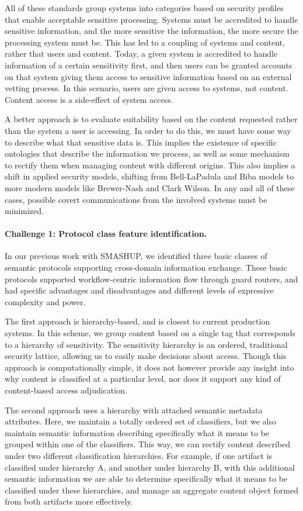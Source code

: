 \documentclass{sbir}
\begin{document}
All of these standards group systems into categories based on security profiles that enable acceptable sensitive processing. Systems must be accredited to handle sensitive information, and the more sensitive the information, the more secure the processing system must be. This has led to a coupling of systems and content, rather that users and content. Today, a given system is accredited to handle information of a certain sensitivity first, and then users can be granted accounts on that system giving them access to sensitive information based on an external vetting process. In this scenario, users are given access to systems, not content. Content access is a side-effect of system access.

A better approach is to evaluate suitability based on the content requested rather than the system a user is accessing. In order to do this, we must have some way to describe what that sensitive data is. This implies the existence of specific ontologies that describe the information we process, as well as some mechanism to rectify them when managing content with different origins. This also implies a shift in applied security models, shifting from Bell-LaPadula and Biba models to more modern models like Brewer-Nash and Clark Wilson. In any and all of these cases, possible covert communications from the involved systems must be minimized.

\paragraph{Challenge 1: Protocol class feature identification.}
In our previous work with SMASHUP, we identified three basic classes of semantic protocols supporting cross-domain information exchange. These basic protocols supported workflow-centric information flow through guard routers, and had specific advantages and disadvantages and different levels of expressive complexity and power.

The first approach is hierarchy-based, and is closest to current production systems. In this scheme, we group content based on a single tag that corresponds to a hierarchy of sensitivity. The sensitivity hierarchy is an ordered, traditional security lattice, allowing us to easily make decisions about access. Though this approach is computationally simple, it does not however provide any insight into why content is classified at a particular level, nor does it support any kind of content-based access adjudication.

The second approach uses a hierarchy with attached semantic metadata attributes. Here, we maintain a totally ordered set of classifiers, but we also maintain semantic information describing specifically what it means to be grouped within one of the classifiers. This way, we can rectify content described under two different classification hierarchies. For example, if one artifact is classified under hierarchy A, and another under hierarchy B, with this additional semantic information we are able to determine specifically what it means to be classified under these hierarchies, and manage an aggregate content object formed from both artifacts more effectively.
\end{document}
